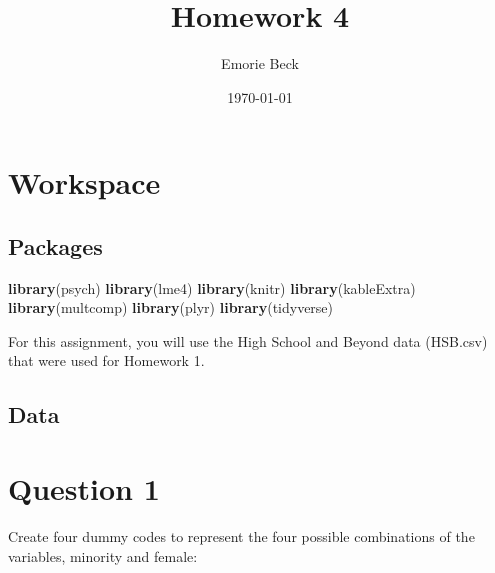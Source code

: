 \documentclass[]{article}
\title{Homework 4}
\author{Emorie Beck}
\date{\today}
\newenvironment{Shaded}{\begin{snugshade}}{\end{snugshade}}
\newcommand{\KeywordTok}[1]{\textcolor[rgb]{0.13,0.29,0.53}{\textbf{#1}}}
\newcommand{\StringTok}[1]{\textcolor[rgb]{0.31,0.60,0.02}{#1}}
\newcommand{\OperatorTok}[1]{\textcolor[rgb]{0.81,0.36,0.00}{\textbf{#1}}}
\newcommand{\NormalTok}[1]{#1}
\begin{document}
\maketitle

{
\setcounter{tocdepth}{2}
\tableofcontents
}
\section{Workspace}\label{workspace}

\subsection{Packages}\label{packages}

\begin{Shaded}
\begin{Highlighting}[]
\KeywordTok{library}\NormalTok{(psych)}
\KeywordTok{library}\NormalTok{(lme4)}
\KeywordTok{library}\NormalTok{(knitr)}
\KeywordTok{library}\NormalTok{(kableExtra)}
\KeywordTok{library}\NormalTok{(multcomp)}
\KeywordTok{library}\NormalTok{(plyr)}
\KeywordTok{library}\NormalTok{(tidyverse)}
\end{Highlighting}
\end{Shaded}

For this assignment, you will use the High School and Beyond data
(HSB.csv) that were used for Homework 1.

\subsection{Data}\label{data}

\begin{Shaded}
\end{Shaded}

\section{Question 1}\label{question-1}

Create four dummy codes to represent the four possible combinations of
the variables, minority and female:
\end{document}
